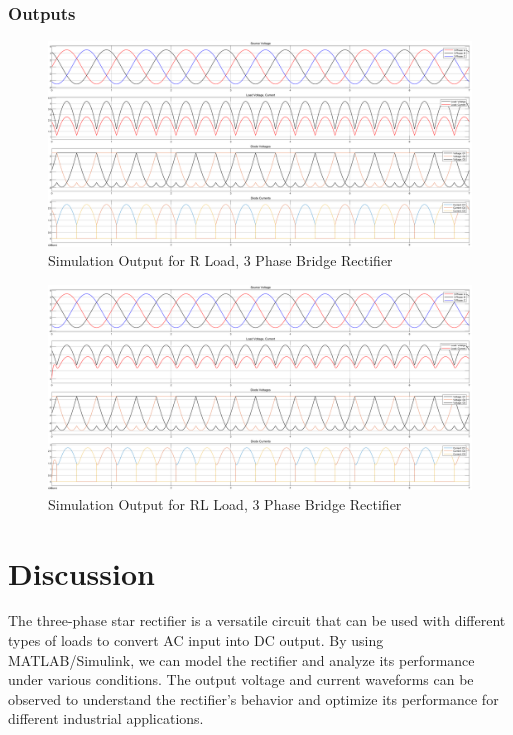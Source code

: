 \documentclass[12pt]{article}
\begin{document}
\subsubsection*{Outputs}
\begin{figure}[H]
    \centering
    \includegraphics[width=\textwidth]{r.png}
    \caption{Simulation Output for R Load, 3 Phase Bridge Rectifier}
    \label{fig:rLoad}
\end{figure}

\begin{figure}[H]
    \centering
    \includegraphics[width=\textwidth]{rl.png}
    \caption{Simulation Output for RL Load, 3 Phase Bridge Rectifier}
    \label{fig:rlLoad}
\end{figure}

\section*{Discussion}
The three-phase star rectifier is a versatile circuit that can be used with different types of loads to convert AC input into DC output. By using MATLAB/Simulink, we can model the rectifier and analyze its performance under various conditions. The output voltage and current waveforms can be observed to understand the rectifier's behavior and optimize its performance for different industrial applications.
\end{document}
